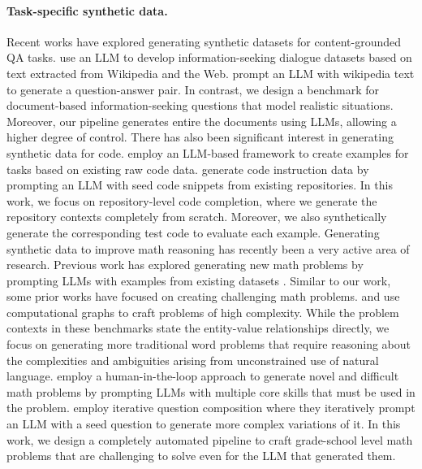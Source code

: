 \paragraph{Task-specific synthetic data.} Recent works have explored generating synthetic datasets for content-grounded QA tasks. \citet{pmlr-v162-dai22a} 
 use an LLM to develop information-seeking dialogue datasets based on text extracted from Wikipedia and the Web. \citet{genie} prompt an LLM with wikipedia text to generate a question-answer pair. In contrast, we design a benchmark for document-based information-seeking questions that model realistic situations. Moreover, our pipeline generates entire the documents using LLMs, allowing a higher degree of control. There has also been significant interest in generating synthetic data for code. \citet{yu-etal-2024-wavecoder} employ an LLM-based framework to create examples for tasks based on existing raw code data. \citet{pmlr-v235-wei24h} generate code instruction data by prompting an LLM with seed code snippets from existing repositories. In this work, we focus on repository-level code completion, where we generate the repository contexts completely from scratch. Moreover, we also synthetically generate the corresponding test code to evaluate each example. Generating synthetic data to improve math reasoning has recently been a very active area of research. Previous work has explored generating new math problems by prompting LLMs with examples from existing datasets \citep{liu2023tinygsmachieving80gsm8k, yu2024metamath, lu-etal-2024-mathgenie}. Similar to our work, some prior works have focused on creating challenging math problems. \citet{ye2024physicslanguagemodels21} and \citet{zhou2025gsminfinitellmsbehaveinfinitely} use computational graphs to craft problems of high complexity. While the problem contexts in these benchmarks state the entity-value relationships directly, we focus on generating more traditional word problems that require reasoning about the complexities and ambiguities arising from unconstrained use of natural language. \citet{shah2024aiassistedgenerationdifficultmath} employ a human-in-the-loop approach to generate novel and difficult math problems by prompting LLMs with multiple core skills that must be used in the problem. \citet{liu2024augmentingmathwordproblems} employ iterative question composition where they iteratively prompt an LLM with a seed question to generate more complex variations of it. In this work, we design a completely automated pipeline to craft grade-school level math problems that are challenging to solve even for the LLM that generated them.